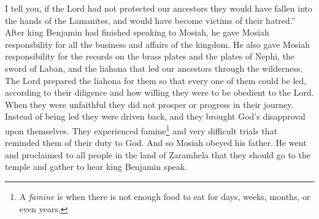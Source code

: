\bverse \iffalse For I say unto you, that if he had not extended his arm in the preservation of our fathers they must have fallen into the hands of the Lamanites, and become victims to their hatred. \fi
I tell you, if the Lord had not protected our ancestors they would have fallen into the hands of the Lamanites, and would have become victims of their hatred.''
\bverse \iffalse And it came to pass that after king Benjamin had made an end of these sayings to his son, that he gave him charge concerning all the affairs of the kingdom. \fi
After king Benjamin had finished speaking to Mosiah, he gave Mosiah responsbility for all the business and affairs of the kingdom.
\bverse \iffalse And moreover, he also gave him charge concerning the records which were engraven on the plates of brass; and also the plates of Nephi; and also, the sword of Laban, and the ball or director, which led our fathers through the wilderness, which was prepared by the hand of the Lord that thereby they might be led, every one according to the heed and diligence which they gave unto him. \fi
He also gave Mosiah responsibility for the records on the brass plates and the plates of Nephi, the sword of Laban, and the liahona that led our ancestors through the wilderness. The Lord prepared the liahona for them so that every one of them could be led, according to their diligence and how willing they were to be obedient to the Lord.
\bverse \iffalse Therefore, as they were unfaithful they did not prosper nor progress in their journey, but were driven back, and incurred the displeasure of God upon them; and therefore they were smitten with famine and sore afflictions, to stir them up in remembrance of their duty. \fi
When they were unfaithful they did not prosper or progress in their journey. Instead of being led they were driven back, and they brought God's disapproval upon themselves. They experienced famine\footnote{A \textit{famine} is when there is not enough food to eat for days, weeks, months, or even years.} and very difficult trials that reminded them of their duty to God.
\bverse \iffalse And now, it came to pass that Mosiah went and did as his father had commanded him, and proclaimed unto all the people who were in the land of Zarahemla that thereby they might gather themselves together, to go up to the temple to hear the words which his father should speak unto them. \fi
And so Mosiah obeyed his father. He went and proclaimed to all people in the land of Zaramhela that they should go to the temple and gather to hear king Benjamin speak.
